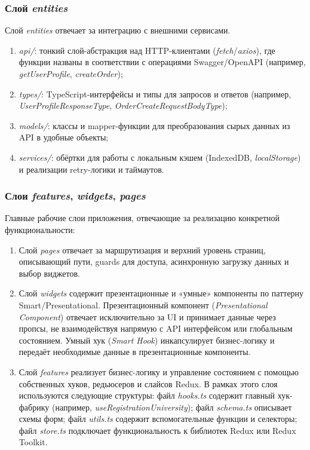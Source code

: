 \subsubsection{Слой \textit{entities}}

Слой \textit{entities} отвечает за интеграцию с внешними сервисами.
\begin{enumerate}
  \item \textit{api/}: тонкий слой-абстракция над HTTP-клиентами (\textit{fetch}/\textit{axios}), где функции названы в соответствии с операциями Swagger/OpenAPI (например, \textit{getUserProfile}, \textit{createOrder});
  \item \textit{types/}: TypeScript-интерфейсы и типы для запросов и ответов (например, \textit{UserProfileResponseType}, \textit{OrderCreateRequestBodyType});
  \item \textit{models/}: классы и mapper-функции для преобразования сырых данных из API в удобные объекты;
  \item \textit{services/}: обёртки для работы с локальным кэшем (IndexedDB, \textit{localStorage}) и реализации retry-логики и таймаутов.
\end{enumerate}

\subsubsection{Слои \textit{features}, \textit{widgets}, \textit{pages}}

Главные рабочие слои приложения, отвечающие за реализацию конкретной функциональности:
\begin{enumerate}
  \item Слой \textit{pages} отвечает за маршрутизация и верхний уровень страниц, описывающий пути, guards для доступа, асинхронную загрузку данных и выбор виджетов.
  \item Слой \textit{widgets} содержит презентационные и «умные» компоненты по паттерну Smart/Presentational. Презентационный компонент (\textit{Presentational Component}) отвечает исключительно за UI и принимает данные через пропсы, не взаимодействуя напрямую с API интерфейсом или глобальным состоянием. Умный хук (\textit{Smart Hook}) инкапсулирует бизнес-логику и передаёт необходимые данные в презентационные компоненты.
  \item Слой \textit{features} реализует бизнес-логику и управление состоянием с помощью собственных хуков, редьюсеров и слайсов Redux. В рамках этого слоя используются следующие структуры: файл \textit{hooks.ts} содержит главный хук-фабрику (например, \textit{useRegistrationUniversity}); файл \textit{schema.ts} описывает схемы форм; файл \textit{utils.ts} содержит вспомогательные функции и селекторы; файл \textit{store.ts} подключает функциональность к библиотек Redux или Redux Toolkit.
\end{enumerate}

